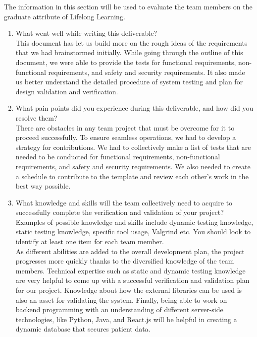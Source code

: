 \documentclass[12pt, titlepage]{article}
\begin{document}
The information in this section will be used to evaluate the team members on the
graduate attribute of Lifelong Learning.



\begin{enumerate}
  \item What went well while writing this deliverable?\\
  This document has let us build more on the rough ideas of the requirements that we had brainstormed initially. While going through the outline of this document, we were able to provide the tests for functional requirements, non-functional requirements, and safety and security requirements. It also made us better understand the detailed procedure of system testing and plan for design validation and verification. 
  
  \item What pain points did you experience during this deliverable, and how did you resolve them?\\
  There are obstacles in any team project that must be overcome for it to proceed successfully. To ensure seamless operations, we had to develop a strategy for contributions. We had to collectively make a list of tests that are needed to be conducted for functional requirements, non-functional requirements, and safety and security requirements. We also needed to create a schedule to contribute to the template and review each other's work in the best way possible.

  \item What knowledge and skills will the team collectively need to acquire to successfully complete the verification and validation of your project? Examples of possible knowledge and skills include dynamic testing knowledge, static testing knowledge, specific tool usage, Valgrind etc.  You should look to identify at least one item for each team member.\\
  As different abilities are added to the overall development plan, the project progresses more quickly thanks to the diversified knowledge of the team members. Technical expertise such as static and dynamic testing knowledge are very helpful to come up with a successful verification and validation plan for our project. Knowledge about how the external libraries can be used is also an asset for validating the system. Finally, being able to work on backend programming with an understanding of different server-side technologies, like Python, Java, and React.js will be helpful in creating a dynamic database that secures patient data.


\end{enumerate}
\end{document}
